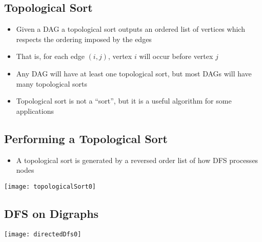 
\begin{slide}
\section{Topological Sort}

\begin{PauseHighLight}
  \begin{itemize}
  \item Given a DAG a topological sort outputs an ordered list of
    vertices which respects the ordering imposed by the edges\pause
  \item That is, for each edge $(i,j)$, vertex $i$ will occur before
    vertex $j$\pause
  \item Any DAG will have at least one topological sort, but most DAGs
    will have many topological sorts\pause
  \item Topological sort is not a ``sort'', but it is a useful algorithm
    for some applications\pause
  \end{itemize}
\end{PauseHighLight}

\end{slide}


\begin{slide}
\section[-1]{Performing a Topological Sort}

\pb
\pause
\begin{itemize}
\item A topological sort is generated by a reversed order list of how
    DFS processes nodes\pauseh
\end{itemize}
\begin{center}
  \texttt{[image: topologicalSort0]}
  {}
\end{center}

\end{slide}


\begin{slide}
\section{DFS on Digraphs}

\pb\pause
  \texttt{[image: directedDfs0]}
\end{slide}

